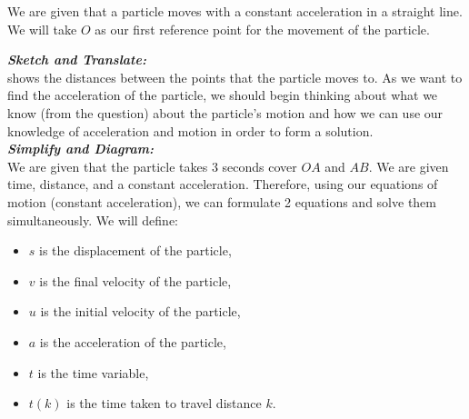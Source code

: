 %
%
%


\begin{subquestions}
	
\subquestion

We are given that a particle moves with a constant acceleration in a straight line. We will take $O$ as our first reference point for the movement of the particle.

\begin{subsubquestions}
	
\subsubquestion

\textbf{\textit{Sketch and Translate:}} \\
 shows the distances between the points that the particle moves to. As we want to find the acceleration of the particle, we should begin thinking about what we know (from the question) about the particle's motion and how we can use our knowledge of acceleration and motion in order to form a solution. \\





\textbf{\textit{Simplify and Diagram:}} \\
We are given that the particle takes 3 seconds cover $OA$ and $AB$. We are given time, distance, and a constant acceleration. Therefore, using our equations of motion (constant acceleration), we can formulate 2 equations and solve them simultaneously.
We will define:
\begin{itemize}
	\item $s$ is the displacement of the particle,
	\item $v$ is the final velocity of the particle,
	\item $u$ is the initial velocity of the particle,
	\item $a$ is the acceleration of the particle,
	\item $t$ is the time variable,
	\item $t(k)$ is the time taken to travel distance $k$.
\end{itemize}




\end{subsubquestions}
\end{subquestions}
